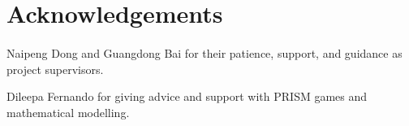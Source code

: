 \section*{Acknowledgements}

\paragraph{}

Naipeng Dong and Guangdong Bai for their patience, support, and guidance as project supervisors.

Dileepa Fernando for giving advice and support with PRISM games and mathematical modelling.

\clearpage

\tableofcontents

\clearpage

\listoffigures

\clearpage

\listoftables

\clearpage
